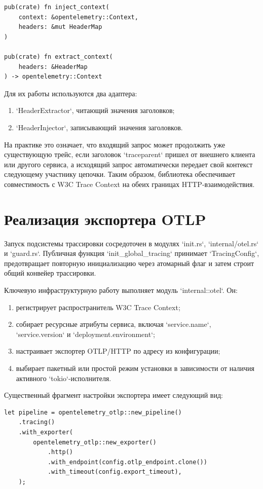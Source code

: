 \begin{verbatim}
pub(crate) fn inject_context(
    context: &opentelemetry::Context,
    headers: &mut HeaderMap
)

pub(crate) fn extract_context(
    headers: &HeaderMap
) -> opentelemetry::Context
\end{verbatim}

Для их работы используются два адаптера:
\begin{enumerate}
    \item `HeaderExtractor`, читающий значения заголовков;
    \item `HeaderInjector`, записывающий значения заголовков.
\end{enumerate}

На практике это означает, что входящий запрос может продолжить уже существующую
трейс, если заголовок `traceparent` пришел от внешнего клиента или другого
сервиса, а исходящий запрос автоматически передает свой контекст следующему
участнику цепочки. Таким образом, библиотека обеспечивает совместимость с W3C
Trace Context на обеих границах HTTP-взаимодействия.

\section{Реализация экспортера OTLP}

Запуск подсистемы трассировки сосредоточен в модулях `init.rs`,
`internal/otel.rs` и `guard.rs`. Публичная функция `init_global_tracing`
принимает `TracingConfig`, предотвращает повторную инициализацию через атомарный
флаг и затем строит общий конвейер трассировки.

Ключевую инфраструктурную работу выполняет модуль `internal::otel`. Он:
\begin{enumerate}
    \item регистрирует распространитель W3C Trace Context;
    \item собирает ресурсные атрибуты сервиса, включая `service.name`,
    `service.version` и `deployment.environment`;
    \item настраивает экспортер OTLP/HTTP по адресу из конфигурации;
    \item выбирает пакетный или простой режим установки в зависимости от
    наличия активного `tokio`-исполнителя.
\end{enumerate}

Существенный фрагмент настройки экспортера имеет следующий вид:

\begin{verbatim}
let pipeline = opentelemetry_otlp::new_pipeline()
    .tracing()
    .with_exporter(
        opentelemetry_otlp::new_exporter()
            .http()
            .with_endpoint(config.otlp_endpoint.clone())
            .with_timeout(config.export_timeout),
    );
\end{verbatim}


